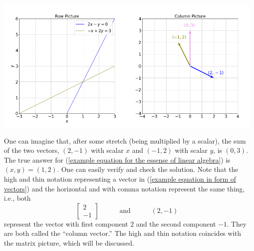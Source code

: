 \documentclass[11pt]{article}
\theoremstyle{break}
\theoremstyle{no_label}
\numberwithin{equation}{section}
\begin{document}
\begin{center}
    \includegraphics[width=0.5\textwidth]{example equation for the essense of linear algebra.png}\includegraphics[width=0.5\textwidth]{example equation as column picture.png}
\end{center}

One can imagine that, after some stretch (being multiplied by a scalar), the sum of the two vectors, $(2, -1)$ with scalar $x$ and $(-1, 2)$ with scalar $y$, is $(0, 3)$. The true answer for (\ref{example equation for the essense of linear algebra}) is $(x, y)=(1, 2)$. One can easily verify and check the solution. Note that the high and thin notation representing a vector in (\ref{example equation in form of vectors}) and the horizontal and with comma notation represent the same thing, i.e., both \begin{equation*}
    \begin{bmatrix}
        2 \\ -1
    \end{bmatrix}\quad\quad\quad\text{and}\quad\quad\quad(2, -1)
\end{equation*}
represent the vector with first component $2$ and the second component $-1$. They are both called the ``column vector.'' The high and thin notation coincides with the matrix picture, which will be discussed.
\end{document}
